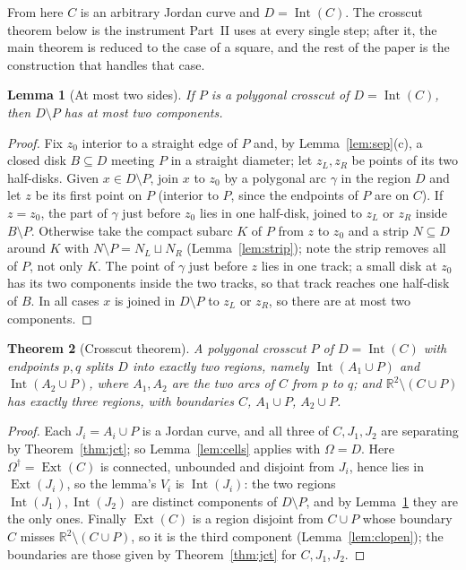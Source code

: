 \documentclass[11pt,a4paper]{article}
\theoremstyle{jsplain}
\newtheorem{theorem}{Theorem}[section]
\newtheorem{lemma}[theorem]{Lemma}
\theoremstyle{jsdefn}
\newcommand{\Int}{\operatorname{Int}}
\newcommand{\Ext}{\operatorname{Ext}}
\begin{document}
From here $C$ is an arbitrary Jordan curve and $D=\Int(C)$. The crosscut
theorem below is the instrument Part~II uses at every single step; after
it, the main theorem is reduced to the case of a square, and the rest of
the paper is the construction that handles that case.

\begin{lemma}[At most two sides]\label{lem:twosides}
If $P$ is a polygonal crosscut of $D=\Int(C)$, then $D\setminus P$ has
at most two components.
\end{lemma}
\begin{proof}
Fix $z_0$ interior to a straight edge of $P$ and, by
Lemma~\ref{lem:sep}(c), a closed disk $B\subseteq D$ meeting $P$ in a
straight diameter; let $z_L,z_R$ be points of its two half-disks.
Given $x\in D\setminus P$, join $x$ to $z_0$ by a polygonal arc
$\gamma$ in the region $D$ and let $z$ be its first point on $P$
(interior to $P$, since the endpoints of $P$ are on $C$). If $z=z_0$,
the part of $\gamma$ just before $z_0$ lies in one half-disk, joined
to $z_L$ or $z_R$ inside $B\setminus P$. Otherwise take the compact
subarc $K$ of $P$ from $z$ to $z_0$ and a strip $N\subseteq D$ around
$K$ with $N\setminus P=N_L\sqcup N_R$ (Lemma~\ref{lem:strip}); note
the strip removes all of $P$, not only $K$. The point of $\gamma$ just
before $z$ lies in one track; a small disk at $z_0$ has its two
components inside the two tracks, so that track reaches one half-disk
of $B$. In all cases $x$ is joined in $D\setminus P$ to $z_L$ or
$z_R$, so there are at most two components.
\end{proof}

\begin{theorem}[Crosscut theorem]\label{thm:cross}
A polygonal crosscut $P$ of $D=\Int(C)$ with endpoints $p,q$ splits
$D$ into exactly two regions, namely $\Int(A_1\cup P)$ and
$\Int(A_2\cup P)$, where $A_1,A_2$ are the two arcs of $C$ from $p$ to
$q$; and $\mathbb R^2\setminus(C\cup P)$ has exactly three regions,
with boundaries $C$, $A_1\cup P$, $A_2\cup P$.
\end{theorem}
\begin{proof}
Each $J_i=A_i\cup P$ is a Jordan curve, and all three of $C,J_1,J_2$
are separating by Theorem~\ref{thm:jct}; so Lemma~\ref{lem:cells}
applies with $\Omega=D$. Here $\Omega^\dagger=\Ext(C)$ is connected,
unbounded and disjoint from $J_i$, hence lies in $\Ext(J_i)$, so the
lemma's $V_i$ is $\Int(J_i)$: the two regions $\Int(J_1),\Int(J_2)$ are
distinct components of $D\setminus P$, and by
Lemma~\ref{lem:twosides} they are the only ones. Finally $\Ext(C)$ is
a region disjoint from $C\cup P$ whose boundary $C$ misses
$\mathbb R^2\setminus(C\cup P)$, so it is the third component
(Lemma~\ref{lem:clopen}); the boundaries are those given by
Theorem~\ref{thm:jct} for $C,J_1,J_2$.
\end{proof}
\end{document}
